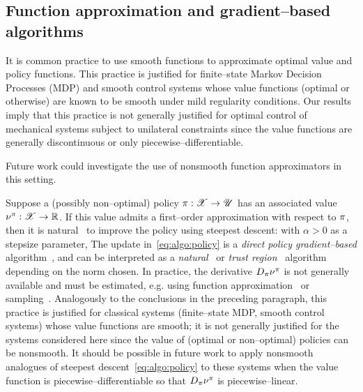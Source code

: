 \documentclass{article}
\begin{document}
\subsection{Function approximation and gradient--based algorithms}
\label{sec:disc:smooth}

It is common practice to use smooth functions to approximate optimal value and policy functions.
This practice is justified for finite--state Markov Decision Processes (MDP) and smooth control systems whose value functions (optimal or otherwise) are known to be smooth under mild regularity conditions.
Our results imply that this practice is not generally justified for optimal control of mechanical systems subject to unilateral constraints since the value functions are generally discontinuous or only piecewise--differentiable.

Future work could investigate the use of nonsmooth function approximators in this setting. 

Suppose a (possibly non--optimal) policy 
$\pi:\mathscr{X}\rightarrow\mathscr{U}$ 
has an associated value
$\nu^\pi:\mathscr{X}\rightarrow\mathbb{R}$. 
If this value admits a first--order approximation with respect to $\pi$,
then it is natural%
~to improve the policy using steepest descent:
with $\alpha > 0$ as a stepsize parameter,
The update in~\eqref{eq:algo:policy} is a \emph{direct policy gradient--based} algorithm~\cite{Sutton2000-ap, Baxter2001-ua}, and can be interpreted as a \emph{natural}~\cite{Kakade2001-az} or \emph{trust region}~\cite{Schulman2015-kr} algorithm depending on the norm chosen.
In practice, the derivative $D_\pi\nu^\pi$ is not generally available and must be estimated, e.g. using function approximation~\cite{Doya2000-gk, Konda2003-av} or sampling~\cite{Baxter2001-ua, Silver2014-lj}.
Analogously to the conclusions in the preceding paragraph, 
this practice is justified for classical systems (finite--state MDP, smooth control systems) whose value functions are smooth;
it is not generally justified for the systems considered here since the value of (optimal or non--optimal) policies can be nonsmooth.
It should be possible in future work to apply nonsmooth analogues of steepest descent~\eqref{eq:algo:policy} to these systems when the value function is piecewise--differentiable so that $D_\pi\nu^\pi$ is piecewise--linear.
\end{document}
